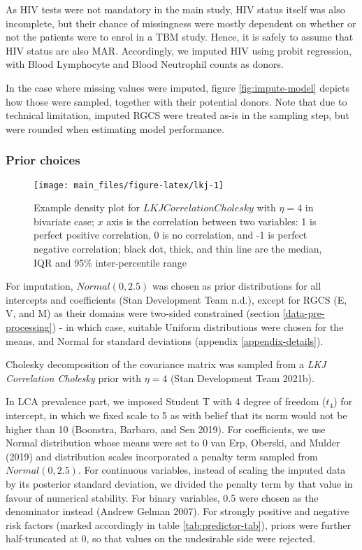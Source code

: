 \documentclass[
]{article}
\begin{document}
As HIV tests were not mandatory in the main study, HIV status itself was also incomplete, but their chance of missingness were mostly dependent on whether or not the patients were to enrol in a TBM study. Hence, it is safely to assume that HIV status are also MAR. Accordingly, we imputed HIV using probit regression, with Blood Lymphocyte and Blood Neutrophil counts as donors.

In the case where missing values were imputed, figure \ref{fig:impute-model} depicts how those were sampled, together with their potential donors. Note that due to technical limitation, imputed RGCS were treated as-is in the sampling step, but were rounded when estimating model performance.

\hypertarget{prior-choices}{%
\subsubsection{Prior choices}\label{prior-choices}}

\begin{figure}

{\centering \texttt{[image: main\_files/figure-latex/lkj-1]} 

}

\caption{Example density plot for $LKJCorrelationCholesky$ with $\eta=4$ in bivariate case; $x$ axis is the correlation between two variables: 1 is perfect positive correlation, 0 is no correlation, and -1 is perfect negative correlation; black dot, thick, and thin line are the median, IQR and 95\% inter-percentile range}\label{fig:lkj}
\end{figure}

For imputation, \(Normal(0,2.5)\) was chosen as prior distributions for all intercepts and coefficients (Stan Development Team n.d.), except for RGCS (E, V, and M) as their domains were two-sided constrained (section \ref{data-pre-processing}) - in which case, suitable Uniform distributions were chosen for the means, and Normal for standard deviations (appendix \ref{appendix-details}).

Cholesky decomposition of the covariance matrix was sampled from a \emph{LKJ Correlation Cholesky} prior with \(\eta = 4\) (Stan Development Team 2021b).

In LCA prevalence part, we imposed Student T with 4 degree of freedom (\(t_4\)) for intercept, in which we fixed scale to 5 as with belief that its norm would not be higher than 10 (Boonstra, Barbaro, and Sen 2019). For coefficients, we use Normal distribution whose means were set to 0 van Erp, Oberski, and Mulder (2019) and distribution scales incorporated a penalty term sampled from \(Normal(0, 2.5)\). For continuous variables, instead of scaling the imputed data by its posterior standard deviation, we divided the penalty term by that value in favour of numerical stability. For binary variables, 0.5 were chosen as the denominator instead (Andrew Gelman 2007). For strongly positive and negative risk factors (marked accordingly in table \ref{tab:predictor-tab}), priors were further half-truncated at 0, so that values on the undesirable side were rejected.
\end{document}
